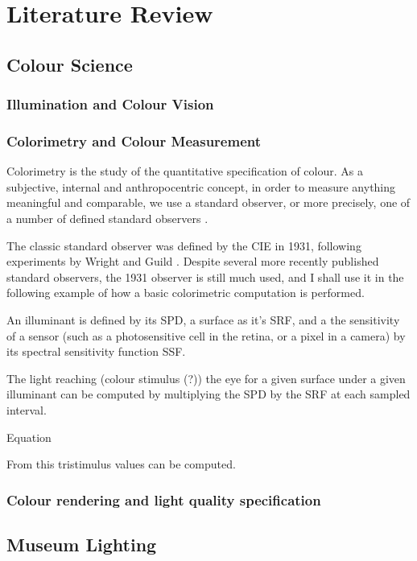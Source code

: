 \chapter{Literature Review}
\label{LitReview}

\section{Colour Science}
\subsection{Illumination and Colour Vision}
\subsection{Colorimetry and Colour Measurement}

Colorimetry is the study of the quantitative specification of colour. As a subjective, internal and anthropocentric concept, in order to measure anything meaningful and comparable, we use a standard observer, or more precisely, one of a number of defined standard observers \cite{cie_bs_2011}.

The classic standard observer was defined by the CIE in 1931, following experiments by Wright and Guild \cite{wright_re-determination_1929, guild_colorimetric_1931}. Despite several more recently published standard observers, the 1931 observer is still much used, and I shall use it in the following example of how a basic colorimetric computation is performed.

An illuminant is defined by its \gls{SPD}, a surface as it's \gls{SRF}, and a the sensitivity of a sensor (such as a photosensitive cell in the retina, or a pixel in a camera) by its spectral sensitivity function \gls{SSF}.

The light reaching (colour stimulus (?)) the eye for a given surface under a given illuminant can be computed by multiplying the \gls{SPD} by the SRF at each sampled interval.

Equation

From this tristimulus values can be computed.

\subsection{Colour rendering and light quality specification}

\section{Museum Lighting}

